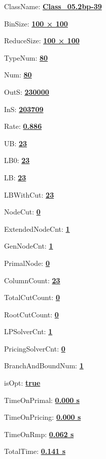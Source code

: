 \documentclass[11pt]{article}
\begin{document}
\pagestyle{empty}


ClassName: \underline{\textbf{Class_05.2bp-39}}
\par
BinSize: \underline{\textbf{100 × 100}}
\par
ReduceSize: \underline{\textbf{100 × 100}}
\par
TypeNum: \underline{\textbf{80}}
\par
Num: \underline{\textbf{80}}
\par
OutS: \underline{\textbf{230000}}
\par
InS: \underline{\textbf{203709}}
\par
Rate: \underline{\textbf{0.886}}
\par
UB: \underline{\textbf{23}}
\par
LB0: \underline{\textbf{23}}
\par
LB: \underline{\textbf{23}}
\par
LBWithCut: \underline{\textbf{23}}
\par
NodeCut: \underline{\textbf{0}}
\par
ExtendedNodeCnt: \underline{\textbf{1}}
\par
GenNodeCnt: \underline{\textbf{1}}
\par
PrimalNode: \underline{\textbf{0}}
\par
ColumnCount: \underline{\textbf{23}}
\par
TotalCutCount: \underline{\textbf{0}}
\par
RootCutCount: \underline{\textbf{0}}
\par
LPSolverCnt: \underline{\textbf{1}}
\par
PricingSolverCnt: \underline{\textbf{0}}
\par
BranchAndBoundNum: \underline{\textbf{1}}
\par
isOpt: \underline{\textbf{true}}
\par
TimeOnPrimal: \underline{\textbf{0.000 s}}
\par
TimeOnPricing: \underline{\textbf{0.000 s}}
\par
TimeOnRmp: \underline{\textbf{0.062 s}}
\par
TotalTime: \underline{\textbf{0.141 s}}
\par
\newpage


\end{document}
